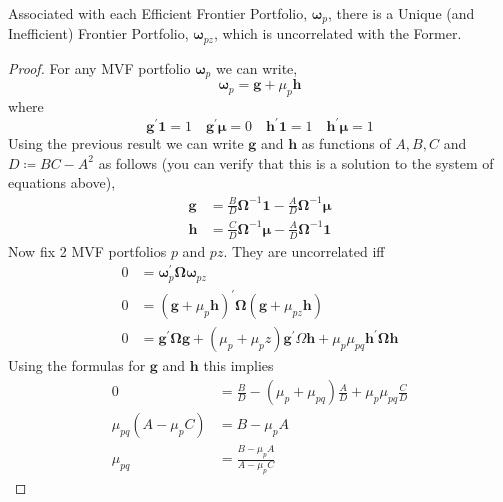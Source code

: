 \documentclass[12pt,twoside]{article}
\begin{document}
\begin{enumerate}
\begin{solution}
        \begin{result}
            Associated with each Efficient Frontier Portfolio, \(\mathbf\omega_p\), there is a Unique (and Inefficient) Frontier Portfolio, \(\mathbf \omega_{pz}\), which is uncorrelated with the Former.
        \end{result}
        \begin{proof}
            For any MVF portfolio \(\mathbf\omega_p\) we can write,
            \[
                \mathbf\omega_p = \mathbf g + \mu_p\mathbf h
            \]
            where 
            \[
                \mathbf g^\prime \mathbf 1 = 1 \quad \mathbf g^\prime\mathbf\mu = 0 \quad \mathbf h^\prime\mathbf 1 = 1 \quad \mathbf h^\prime \mathbf \mu = 1
            \] 
            Using the previous result we can write \(\mathbf g\) and \(\mathbf h\) as functions of \(A,B,C\) and \(D \coloneqq BC-A^2\) as follows (you can verify that this is a solution to the system of equations above),
            \begin{align*}
                \mathbf g & = \frac{B}{D} \mathbf\Omega^{-1}\mathbf 1 - \frac{A}{D}\mathbf\Omega^{-1}\mathbf \mu \\
                \mathbf h& = \frac{C}{D} \mathbf\Omega^{-1}\mathbf \mu - \frac{A}{D}\mathbf\Omega^{-1}\mathbf 1
            \end{align*}
            Now fix 2 MVF portfolios \(p\) and \(pz\). They are uncorrelated iff
            \begin{align*}
                0 & = \mathbf\omega_p^\prime \mathbf\Omega \mathbf\omega_{pz} \\
                0 & =  \left(\mathbf g + \mu_p\mathbf h\right)^\prime \mathbf\Omega \left(\mathbf g + \mu_{pz}\mathbf h\right) \\
                0 & = \mathbf g^\prime \mathbf \Omega \mathbf g + \left(\mu_p+\mu_pz\right)\mathbf g^\prime\Omega\mathbf h + \mu_p\mu_{pq}\mathbf h^\prime\mathbf\Omega\mathbf h 
            \end{align*}
            Using the formulas for \(\mathbf g\) and \(\mathbf h\) this implies
            \begin{align*}
                0 & = \frac{B}{D} - \left(\mu_p+\mu_{pq}\right)\frac{A}{D} + \mu_p\mu_{pq}\frac{C}{D} \\
                \mu_{pq}\left(A - \mu_p C\right) & = B -\mu_pA \\
                \mu_{pq} & = \frac{B-\mu_pA}{A-\mu_pC}
            \end{align*}
        \end{proof}

\end{solution}
\end{enumerate}
\end{document}
